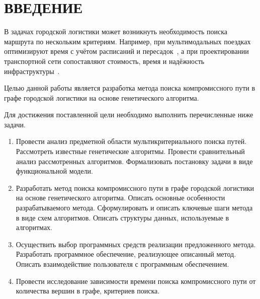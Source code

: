 \chapter*{\centering ВВЕДЕНИЕ}





В задачах городской логистики может возникнуть необходимость поиска маршрута по нескольким критериям. Например, при мультимодальных поездках оптимизируют время с учётом расписаний и пересадок~\cite{teslya2016multimodal}, а при проектировании транспортной сети сопоставляют стоимость, время и надёжность инфраструктуры~\cite{medvedeva2024rail}. 


Целью данной работы является разработка метода поиска компромиссного пути в графе городской логистики на основе генетического алгоритма.

Для достижения поставленной цели необходимо выполнить перечисленные ниже задачи.

\begin{enumerate}
    \item Провести анализ предметной области мультикритериального поиска путей. Рассмотреть известные генетические алгоритмы. Провести сравнительный анализ рассмотренных алгоритмов. Формализовать постановку задачи в виде функциональной модели.
    \item Разработать метод поиска компромиссного пути в графе городской логистики на основе генетического алгоритма. Описать основные особенности разрабатываемого метода. Сформулировать и описать ключевые шаги метода в виде схем алгоритмов. Описать структуры данных, используемые в алгоритмах.
    \item Осуществить выбор программных средств реализации предложенного метода. Разработать программное обеспечение, реализующее описанный метод. Описать взаимодействие пользователя с программным обеспечением.
    \item Провести исследование зависимости времени поиска компромиссного пути от количества вершин в графе, критериев поиска.
\end{enumerate}
